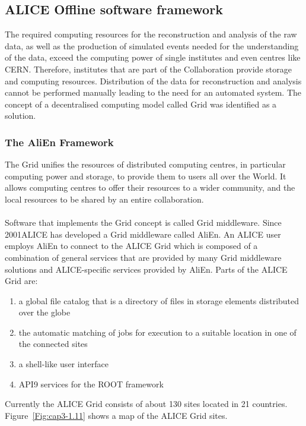 \subsection{ALICE Offline software framework }
\label{par:3.2d}
The required computing resources for the reconstruction and analysis of the raw data, as well as the production of simulated events needed for the understanding of the data, exceed the computing power of single institutes and even centres like CERN. Therefore, institutes that are part of the Collaboration provide storage and computing resources. Distribution of the data for reconstruction and analysis cannot be performed manually leading to the need for an automated system. The concept of a decentralised computing model called Grid was identified as a solution.

\subsubsection{The AliEn Framework}
The Grid unifies the resources of distributed computing centres, in particular computing power and storage, to provide them to users all over the World. It allows computing centres to offer their resources to a wider community, and the local resources to be shared by an entire collaboration.\\
\\
Software that implements the Grid concept is called Grid middleware. Since 2001ALICE has developed a Grid middleware called AliEn. An ALICE user employs AliEn to connect to the ALICE Grid which is composed of a combination of general services that are provided by many Grid middleware solutions and ALICE-specific services provided by AliEn. Parts of the ALICE Grid are:
\begin{enumerate}
\item a global file catalog that is a directory of files in storage elements distributed over the globe
\item  the automatic matching of jobs for execution to a suitable location in one of the connected sites
\item  a shell-like user interface 
\item API9 services for the ROOT framework
\end{enumerate} 
Currently the ALICE Grid consists of about 130 sites located in 21 countries. \mbox{Figure \ref{Fig:cap3-1.11}} shows a map of the ALICE Grid sites.

